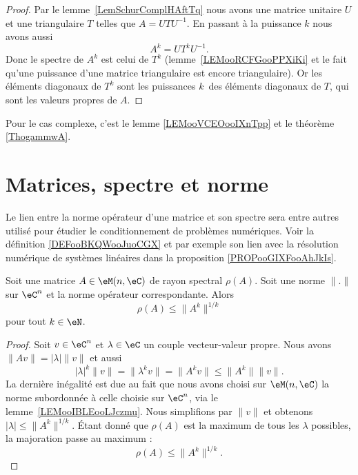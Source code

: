 \begin{proof}
	Par le lemme~\ref{LemSchurComplHAftTq} nous avons une matrice unitaire \( U\) et une triangulaire \( T\) telles que \( A=UTU^{-1}\). En passant à la puissance \( k\) nous avons aussi
	\begin{equation}
		A^k=UT^kU^{-1}.
	\end{equation}
	Donc le spectre de \( A^k\) est celui de \( T^k\) (lemme~\ref{LEMooRCFGooPPXiKi} et le fait qu'une puissance d'une matrice triangulaire est encore triangulaire). Or les éléments diagonaux de \( T^k\) sont les puissances \( k\)\ieme\ des éléments diagonaux de \( T\), qui sont les valeurs propres de \( A\).
\end{proof}
Pour le cas complexe, c'est le lemme \ref{LEMooVCEOooIXnTpp} et le théorème \ref{ThogammwA}.

\section{Matrices, spectre et norme}

Le lien entre la norme opérateur d'une matrice et son spectre sera entre autres utilisé pour étudier le conditionnement de problèmes numériques. Voir la définition \ref{DEFooBKQWooJuoCGX} et par exemple son lien avec la résolution numérique de systèmes linéaires dans la proposition \ref{PROPooGIXFooAhJkIs}.

\begin{proposition}      \label{PROPooKLFKooSVnDzr}
	Soit une matrice \( A\in \eM(n,\eC)\) de rayon spectral \( \rho(A)\). Soit une norme \( \| . \|\) sur \( \eC^n\) et la norme opérateur correspondante. Alors
	\begin{equation}
		\rho(A)\leq \| A^k \|^{1/k}
	\end{equation}
	pour tout \( k\in \eN\).
\end{proposition}

\begin{proof}
	Soit \( v\in \eC^n\) et \( \lambda\in \eC\) un couple vecteur-valeur propre. Nous avons \( \| Av \|=| \lambda |\| v \|\) et aussi
	\begin{equation}
		| \lambda |^k\| v \|=\| \lambda^kv \|=\| A^kv \|\leq \| A^k \|\| v \|.
	\end{equation}
	La dernière inégalité est due au fait que nous avons choisi sur \( \eM(n,\eC)\) la norme subordonnée à celle choisie sur \( \eC^n\), via le lemme~\ref{LEMooIBLEooLJczmu}. Nous simplifions par \( \| v \|\) et obtenons \( | \lambda |\leq \| A^k \|^{1/k}\). Étant donné que \( \rho(A)\) est la maximum de tous les \( \lambda\) possibles, la majoration passe au maximum :
	\begin{equation}
		\rho(A)\leq \| A^k \|^{1/k}.
	\end{equation}
\end{proof}


